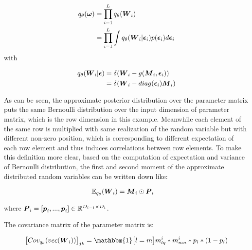 \begin{equation}
\begin{aligned} \label{appro_dist_form}
q_{\theta}(\boldsymbol \omega) &= \prod_{i=1}^{L} q_{\theta}(\boldsymbol W_{i})\\
&= \prod_{i=1}^{L}\int q_{\theta}(\boldsymbol W_{i} | \boldsymbol \epsilon_{i})p(\boldsymbol \epsilon_{i}) d\boldsymbol \epsilon_{i} 
\end{aligned}
\end{equation}
with

\begin{equation}
\begin{aligned} \label{appro_cond_dist_form}
q_{\theta}(\boldsymbol W_{i}|\boldsymbol \epsilon) &= \delta(\boldsymbol W_{i} - g(\boldsymbol M_{i}, \boldsymbol \epsilon_{i}))  \\
& = \delta(\boldsymbol W_{i} - diag(\boldsymbol \epsilon_{i})\boldsymbol M_{i})
\end{aligned}
\end{equation}

As can be seen, the approximate posterior distribution over the parameter matrix puts the same Bernoulli distribution over the input dimension of parameter matrix, which is the row dimension in this example. Meanwhile each element of the same row is multiplied with same realization of the random variable but with different non-zero position, which is corresponding to different expectation of each row element and thus induces correlations between row elements. To make this definition more clear, based on the computation of expectation and variance of Bernoulli distribution, the first and second moment of the approximate distributed random variables can be written down like:

\begin{equation}
\begin{aligned} \label{appr_expectation}
\mathbb E_{q_{\theta}}(\boldsymbol W_{i}) & = \boldsymbol M_{i} \odot \boldsymbol P_{i}
\end{aligned}
\end{equation}

where $\boldsymbol P_{i} = [\boldsymbol p_{i}, ..., \boldsymbol p_{i}] \in \mathbb R^{D_{i-1} \times D_{i}}$.

The covariance matrix of the parameter matrix is:

\begin{equation}
\begin{aligned} \label{appr_covariance}
\big[Cov_{q_{\theta}}(vec(\bld W_{i}))\big]_{jk}   = \mathbbm{1} \big[l=m\big] m^{i}_{lq}*m^{i}_{mn}*p_{i}*(1-p_{i})
\end{aligned}
\end{equation}

